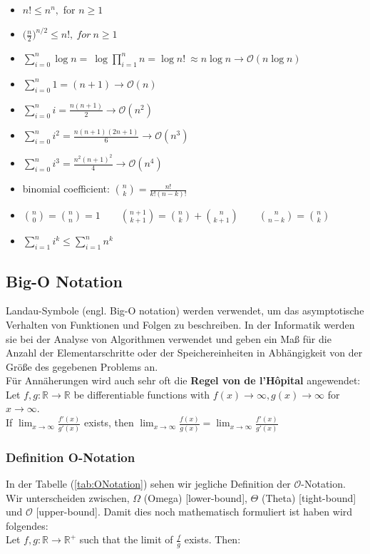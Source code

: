\documentclass[a4paper]{article}
\begin{document}
    \begin{itemize}
        \item  $n! \leq n^n, $ for $  n\geq 1 $
        \item $\big(\frac{n}{2}\big)^{{n}/{2}} \leq n!, \ for\ n\geq 1 $
        \item $ \sum_{i=0}^{n} \log n  = \ \log\prod_{i=1}^{n}n = \log{n!} \ \approx n\log n \to\mathcal{O}(n \log n)$
        \item $\sum_{i=0}^{n} 1 = (n+1)  \to \mathcal{O}(n)$
        \item $\sum_{i=0}^{n} i = \frac{n(n+1)}{2} \to \mathcal{O}(n^2)$
        \item $\sum_{i=0}^{n} i^2 = \frac{n(n+1)(2n+1)}{6} \to \mathcal{O}(n^3)$
        \item $\sum_{i=0}^{n} i^3 = \frac{n^2(n+1)^2}{4}  \to\mathcal{O}(n^4)$
        \item binomial coefficient: $\binom{n}{k}= \frac{n!}{k!(n-k)!}$
        \item $\binom{n}{0}=\binom{n}{n}=1  \quad\quad
              \binom{n+1}{k+1}=\binom{n}{k}+\binom{n}{k+1}  \quad\quad
              \binom{n}{n-k}=\binom{n}{k}$
        \item $\sum_{i=1}^{n}i^k \leq \sum_{i=1}^{n}n^k$
    \end{itemize}
        

    \subsection{Big-O Notation}
    Landau-Symbole (engl. Big-O notation) werden verwendet, um das asymptotische Verhalten von Funktionen und Folgen zu beschreiben.
    In der Informatik werden sie bei der Analyse von Algorithmen verwendet und geben ein Maß für die Anzahl der Elementarschritte oder der Speichereinheiten in Abhängigkeit von der Größe des gegebenen Problems an. \\
    Für Annäherungen wird auch sehr oft die \textbf{Regel von de l'Hôpital} \label{Hôpital} angewendet:\\
        Let $f, g : \mathbb{R}\to\mathbb{R}$ be differentiable functions with $f(x)\to\infty, g(x)\to\infty$ for $x\to\infty$. \\
        If $\lim_{x\to\infty}\frac{f'(x)}{g'(x)}$ exists, then
        $\lim_{x\to\infty}\frac{f(x)}{g(x)}=\lim_{x\to\infty}\frac{f'(x)}{g'(x)}$


    

    \subsubsection{Definition O-Notation}
    In der Tabelle (\ref{tab:ONotation}) sehen wir jegliche Definition der $\mathcal{O}$-Notation.
    Wir unterscheiden zwischen, $\Omega$ (Omega) [lower-bound], $\Theta$ (Theta) [tight-bound] und  $\mathcal{O}$ [upper-bound]. Damit dies noch mathematisch formuliert ist haben wird folgendes: \\
    Let $f, g: \mathbb{R} \rightarrow \mathbb{R}^+$ such that the limit of $\frac f g$ exists. Then:
    
\end{document}
